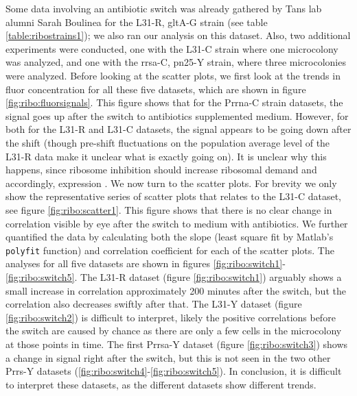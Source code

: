 Some data involving an antibiotic switch was already gathered
by Tans lab alumni Sarah Boulinea for the L31-R, gltA-G strain (see table \ref{table:ribostrains1}); 
we also ran our analysis on this dataset.
Also, two additional experiments were conducted, one with the L31-C strain where one microcolony was analyzed, 
and one with the rrsa-C, pn25-Y strain, where three microcolonies were analyzed.
%
Before looking at the scatter plots, we first look at the 
trends in fluor concentration for all these five datasets, which are shown in figure \ref{fig:ribo:fluorsignals}. 
This figure shows that for the Prrna-C strain datasets, the signal goes up after the switch to antibiotics supplemented medium.
However, for both for the L31-R and L31-C datasets, the signal appears to be going down after the shift (though pre-shift fluctuations on the population average level of the L31-R data make it unclear what is exactly going on).
It is unclear why this happens, since ribosome inhibition should increase ribosomal demand and accordingly, expression \cite{You2013}.
%
We now turn to the scatter plots.
For brevity we only show the representative series of scatter plots that relates to the L31-C dataset, see figure \ref{fig:ribo:scatter1}. 
This figure shows that there is no clear change in correlation visible by eye after the switch to medium with antibiotics.
%
We further quantified the data by calculating both the slope (least square fit by Matlab's \texttt{polyfit} function) and correlation coefficient for each of the scatter plots.
%
The analyses for all five datasets are 
shown in figures \ref{fig:ribo:switch1}-\ref{fig:ribo:switch5}.
%
The L31-R dataset (figure \ref{fig:ribo:switch1}) arguably shows a small increase in correlation approximately 200 minutes after the switch, but the correlation also decreases swiftly after that.
The L31-Y dataset (figure \ref{fig:ribo:switch2}) is difficult to interpret, 
likely the positive correlations before the switch are caused by chance as there are only a few cells in the microcolony at those points in time.
%
The first Prrsa-Y dataset (figure \ref{fig:ribo:switch3}) shows a change in signal right after the switch, but this is not seen in the two other Prrs-Y datasets (\ref{fig:ribo:switch4}-\ref{fig:ribo:switch5}).
%
In conclusion, it is difficult to interpret these datasets, as the different datasets show different trends.


